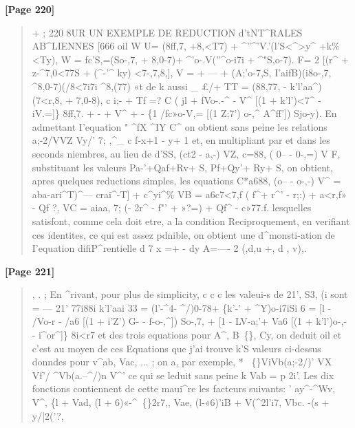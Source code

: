 \documentclass[11pt,a4paper]{book}
\begin{document}
\textbf{[Page 220]}\\[0.2cm]
\begin{quote}
+
;
220 8UR UN EXEMPLE DE REDUCTION d'tNT\textasciicircum{}RALES AB\textasciicircum{}LIENNES [666
oil W
U=
(8ff,7,
+8,<T7) +
\textasciicircum{}''\textasciicircum{}'V.'(l'S<\textasciicircum{}>y\textasciicircum{}
+k\%<Ty),
W
= fc'S,=(So-,7, + 8,0-7)+ \textasciicircum{}'o-.V(''\textasciicircum{}o-i7i + \textasciicircum{}"S,o-7).
F= 2 [(r\textasciicircum{} + z-\textasciicircum{}7,0<77S + (\textasciicircum{}-'\textasciicircum{} ky) <7-,7,8,],
V = + --- +
(A;'o-7,S, I'aifB)(i8o-,7, \textasciicircum{}8,0-7)(/8<7i7i \textasciicircum{}8,(77)
«t de k aussi
\_ £/+ TT = (88,77, - k'l'aa\textasciicircum{})(7<r,8, + 7,0-8),
c
i;- + Tf =? C ( jl + fVo-.-\textasciicircum{} - V\textasciicircum{} [(1 + k'l')<7\textasciicircum{} - iV.=]\} 8ff,7.
+ - + V\textasciicircum{} + -
\{1 /fc»o-V,= [(1 Z;7') o-,\textasciicircum{} A\textasciicircum{}ff']) Sjo-y).
En admettant I'equation
"
\textasciicircum{}fX \textasciicircum{}IY C\textasciicircum{}
on obtient sans peine les relations
a;-2/VVZ Vy/'
7;
,\textasciicircum{}\_ c f-x+1 - y+ 1
et, en multipliant par
et dans les seconds niembres, au lieu de
d'SS, (ct2 - a,-) VZ, c=88, ( 0-- - 0-,=) V F,
substituant les valeurs
Pa-'+Qaf+Rv+ S, Pf+Qy'+ Ry+ S,
on obtient, apres quelques reductions simples, les equations
C*a688, (o-- - o-,-) V\textasciicircum{} = aba-ari\textasciicircum{}T)\textasciicircum{}--- crai\textasciicircum{}-T] + c\textasciicircum{}yi\textasciicircum{}\%
VB = a6c7<7,f ( f\textasciicircum{}+ r\textasciicircum{}' - r;:) + a<r,f» - Qf ?,
VC = aiaa, 7; (- 2r\textasciicircum{} - f"' + »?=) + Qf\textasciicircum{} - c»77.f.
lesquelles satisfont, comme cela doit etre, a la condition
Reciproquement, en verifiant ces identites, ce qui est assez pdnible, on obtient une
d\textasciicircum{}monsti-ation de I'equation difiP\textasciicircum{}rentielle
d 7 x =+ - dy A=---- 2 (,d,u +, d , v),.
\end{quote}

\textbf{[Page 221]}\\[0.2cm]
\begin{quote}
, . ;
En \textasciicircum{}rivant, pour plus de simplicity,
c c c
les valeui-s de 21', S3, (i sont
= ---
21' 77i88i k'l'aai
33
=
(l'-\textasciicircum{}4-
\textasciicircum{}/)0-78+
\{k'-'
+
\textasciicircum{}Y)o-i7iSi
6 = [l - /Vo-r - /a6 [(1 + i'Z') G- - f-o-,\textasciicircum{}]) So-,7,
+ [1 - LV-a;'+ Va6 [(1 + k'l')o-,- - i\textasciicircum{}or\textasciicircum{}]\} 8i<r7
et des trois equations pour A\textasciicircum{}, B~\{\}, Cy, on deduit
oil
et c'est au moyen de ces Equations que j'ai trouve k'S valeurs ci-dessus donndes pour
v\textasciicircum{}ab, Vac, ... ; on a, par exemple,
* ~\{\}ViVb(a;-2/)' VX Vf'/ \textasciicircum{}Vb(a.--\textasciicircum{}/)n V\textasciicircum{}'
ce qui se leduit sans peine k Vab = p 2i'. Les dix fonctions contiennent de cette
maui\textasciicircum{}re les facteurs suivants: '
ay\textasciicircum{}-\textasciicircum{}Wv,
V\textasciicircum{}, \{l +
Vad, (l + 6)«-\textasciicircum{}~\{\}2r7,,
Vae, (l-«6)'iB + V(\textasciicircum{}2l'i7,
Vbc. -(s + y/|2('?,
\end{quote}
\end{document}
